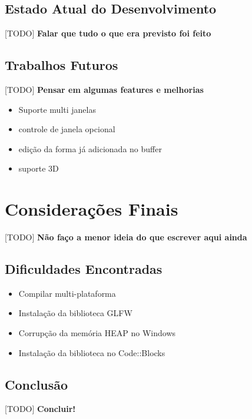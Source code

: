 \documentclass[12pt, %
openright,
oneside, %
a4paper,    %
brazil]{facom-ufu-abntex2}
\begin{document}
\section{Estado Atual do Desenvolvimento}
[TODO] \textbf{Falar que tudo o que era previsto foi feito}

\section{Trabalhos Futuros}
[TODO] \textbf{Pensar em algumas features e melhorias}

\begin{itemize}
    \item Suporte multi janelas
    \item controle de janela opcional
    \item edição da forma já adicionada no buffer
    \item suporte 3D
\end{itemize}

\chapter{Considerações Finais}
[TODO] \textbf{Não faço a menor ideia do que escrever aqui ainda}

\section{Dificuldades Encontradas}

\begin{itemize}
  
  \item Compilar multi-plataforma
  \item Instalação da biblioteca GLFW
  \item Corrupção da memória HEAP no Windows
  \item Instalação da biblioteca no Code::Blocks
  
\end{itemize}

\section{Conclusão}
[TODO] \textbf{Concluir!}

\end{document}
